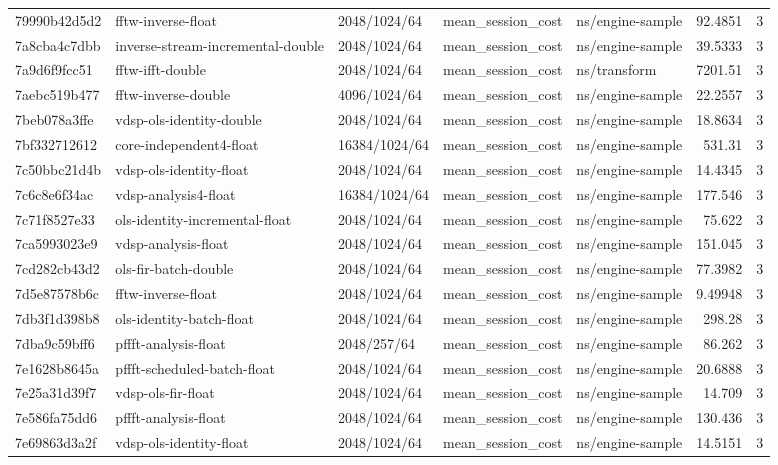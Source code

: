 \begin{longtable}{lllllrr}
79990b42d5d2 & fftw-inverse-float & 2048/1024/64 & mean\_session\_cost & ns/engine-sample & 92.4851 & 3 \\
7a8cba4c7dbb & inverse-stream-incremental-double & 2048/1024/64 & mean\_session\_cost & ns/engine-sample & 39.5333 & 3 \\
7a9d6f9fcc51 & fftw-ifft-double & 2048/1024/64 & mean\_session\_cost & ns/transform & 7201.51 & 3 \\
7aebc519b477 & fftw-inverse-double & 4096/1024/64 & mean\_session\_cost & ns/engine-sample & 22.2557 & 3 \\
7beb078a3ffe & vdsp-ols-identity-double & 2048/1024/64 & mean\_session\_cost & ns/engine-sample & 18.8634 & 3 \\
7bf332712612 & core-independent4-float & 16384/1024/64 & mean\_session\_cost & ns/engine-sample & 531.31 & 3 \\
7c50bbc21d4b & vdsp-ols-identity-float & 2048/1024/64 & mean\_session\_cost & ns/engine-sample & 14.4345 & 3 \\
7c6c8e6f34ac & vdsp-analysis4-float & 16384/1024/64 & mean\_session\_cost & ns/engine-sample & 177.546 & 3 \\
7c71f8527e33 & ols-identity-incremental-float & 2048/1024/64 & mean\_session\_cost & ns/engine-sample & 75.622 & 3 \\
7ca5993023e9 & vdsp-analysis-float & 2048/1024/64 & mean\_session\_cost & ns/engine-sample & 151.045 & 3 \\
7cd282cb43d2 & ols-fir-batch-double & 2048/1024/64 & mean\_session\_cost & ns/engine-sample & 77.3982 & 3 \\
7d5e87578b6c & fftw-inverse-float & 2048/1024/64 & mean\_session\_cost & ns/engine-sample & 9.49948 & 3 \\
7db3f1d398b8 & ols-identity-batch-float & 2048/1024/64 & mean\_session\_cost & ns/engine-sample & 298.28 & 3 \\
7dba9c59bff6 & pffft-analysis-float & 2048/257/64 & mean\_session\_cost & ns/engine-sample & 86.262 & 3 \\
7e1628b8645a & pffft-scheduled-batch-float & 2048/1024/64 & mean\_session\_cost & ns/engine-sample & 20.6888 & 3 \\
7e25a31d39f7 & vdsp-ols-fir-float & 2048/1024/64 & mean\_session\_cost & ns/engine-sample & 14.709 & 3 \\
7e586fa75dd6 & pffft-analysis-float & 2048/1024/64 & mean\_session\_cost & ns/engine-sample & 130.436 & 3 \\
7e69863d3a2f & vdsp-ols-identity-float & 2048/1024/64 & mean\_session\_cost & ns/engine-sample & 14.5151 & 3 \\

\end{longtable}
